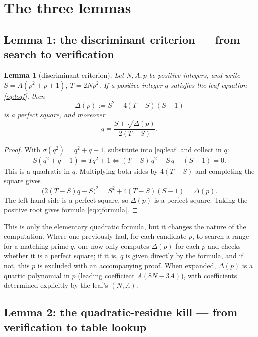 \documentclass[11pt]{article}
\newtheorem{lemma}{Lemma}
\theoremstyle{remark}
\begin{document}
\section{The three lemmas}\label{sec:lemmas}

\subsection{Lemma 1: the discriminant criterion --- from search to verification}\label{sec:lem1}

\begin{lemma}[discriminant criterion]\label{lem:disc} Let $N, A, p$ be positive integers, and write $S = A(p^2 + p + 1)$, $T = 2Np^2$. If a positive integer $q$ satisfies the leaf equation \eqref{eq:leaf}, then
\[ \Delta(p) := S^2 + 4(T - S)(S - 1)
\] is a perfect square, and moreover
\begin{equation} q = \frac{S + \sqrt{\Delta(p)}}{2(T - S)}. \label{eq:qformula}
\end{equation}
\end{lemma}

\begin{proof} With $\sigma(q^2) = q^2 + q + 1$, substitute into \eqref{eq:leaf} and collect in $q$:
\[ S(q^2 + q + 1) = Tq^2 + 1 \iff (T - S)\,q^2 - S\,q - (S - 1) = 0.
\] This is a quadratic in $q$. Multiplying both sides by $4(T - S)$ and completing the square gives
\[ \bigl(2(T - S)q - S\bigr)^2 = S^2 + 4(T - S)(S - 1) = \Delta(p).
\] The left-hand side is a perfect square, so $\Delta(p)$ is a perfect square. Taking the positive root gives formula \eqref{eq:qformula}.
\end{proof}

This is only the elementary quadratic formula, but it changes the nature of the computation. Where one previously had, for each candidate $p$, to search a range for a matching prime $q$, one now only computes $\Delta(p)$ for each $p$ and checks whether it is a perfect square; if it is, $q$ is given directly by the formula, and if not, this $p$ is excluded with an accompanying proof. When expanded, $\Delta(p)$ is a quartic polynomial in $p$ (leading coefficient $A(8N - 3A)$), with coefficients determined explicitly by the leaf's $(N, A)$.

\subsection{Lemma 2: the quadratic-residue kill --- from verification to table lookup}\label{sec:lem2}
\end{document}
